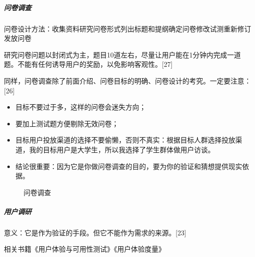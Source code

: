 \documentclass[letterpaper,10pt,english]{sphinxmanual}
\begin{document}
\subparagraph{问卷调查}
\label{\detokenize{chapter_knowledge/users_analysis:id30}}
问卷设计方法：收集资料\sphinxhyphen{}研究问卷形式\sphinxhyphen{}列出标题和提纲\sphinxhyphen{}确定问卷\sphinxhyphen{}修改试测\sphinxhyphen{}重新修订\sphinxhyphen{}发放问卷

研究问卷问题以封闭式为主，题目10道左右，尽量让用户能在1分钟内完成一道题。不能有任何诱导用户的奖励，以免影响客观性。{[}27{]}

同样，问卷调查除了前面介绍、问卷目标的明确、问卷设计的考究。一定要注意：{[}26{]}
\begin{itemize}
\item {} 
目标不要过于多，这样的问卷会迷失方向；

\item {} 
要加上测试题方便剔除无效问卷；

\item {} 
目标用户投放渠道的选择不要偷懒，否则不真实：根据目标人群选择投放渠道，我的目标用户是大学生，所以我选择了学生群体做用户访谈。

\item {} 
结论很重要：因为它是你做问卷调查的目的，要为你的验证和猜想提供现实依据。

\end{itemize}

\begin{figure}[H]
\centering
\capstart

\noindent{}
\caption{问卷调查}\label{\detokenize{chapter_knowledge/users_analysis:id45}}\end{figure}


\subparagraph{用户调研}
\label{\detokenize{chapter_knowledge/users_analysis:id31}}
意义：它是作为验证的手段。但它不能作为需求的来源。{[}23{]}

相关书籍《用户体验与可用性测试》《用户体验度量》
\end{document}

